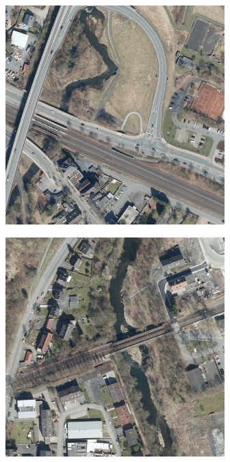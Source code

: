 \begin{figure}
\begin{subfigure}{\DopLabelImageWidth}
    \end{subfigure}
    \hfill
    \begin{subfigure}{\DopLabelImageWidth}
        \includegraphics[width=\textwidth]{images/2281_image}
    \end{subfigure}
    \hfill
    \begin{subfigure}{\DopLabelImageWidth}
        \includegraphics[width=\textwidth]{images/3589_image}
    \end{subfigure}
    \hfill


\end{figure}
